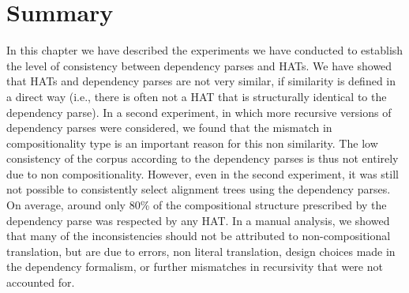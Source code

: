 \section{Summary}

In this chapter we have described the experiments we have conducted to establish the level of consistency between dependency parses and HATs. We have showed that HATs and dependency parses are not very similar, if similarity is defined in a direct way (i.e., there is often not a HAT that is structurally identical to the dependency parse). In a second experiment, in which more recursive versions of dependency parses were considered, we found that the mismatch in compositionality type is an important reason for this non similarity. The low consistency of the corpus according to the dependency parses is thus not entirely due to non compositionality. However, even in the second experiment, it was still not possible to consistently select alignment trees using the dependency parses. On average, around only 80\% of the compositional structure prescribed by the dependency parse was respected by any HAT. In a manual analysis, we showed that many of the inconsistencies should not be attributed to non-compositional translation, but are due to errors, non literal translation, design choices made in the dependency formalism, or further mismatches in recursivity that were not accounted for.
%
%
%